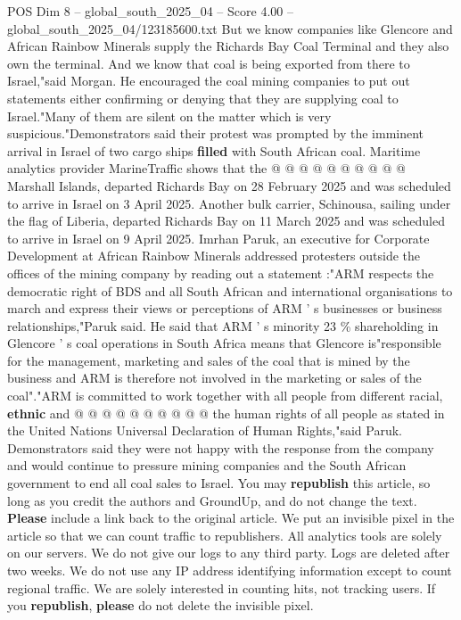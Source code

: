 \begin{textsample}{POS Dim 8 – global\_south\_2025\_04 – Score 4.00 – global\_south\_2025\_04/123185600.txt}
But we know companies like Glencore and African Rainbow Minerals supply the Richards Bay Coal Terminal and they also own the terminal.
And we know that coal is being exported from there to Israel,"said Morgan.
He encouraged the coal mining companies to put out statements either confirming or denying that they are supplying coal to Israel."Many of them are silent on the matter which is very suspicious."Demonstrators said their protest was prompted by the imminent arrival in Israel of two cargo ships \textbf{filled} with South African coal.
Maritime analytics provider MarineTraffic shows that the @ @ @ @ @ @ @ @ @ @ Marshall Islands, departed Richards Bay on 28 February 2025 and was scheduled to arrive in Israel on 3 April 2025.
Another bulk carrier, Schinousa, sailing under the flag of Liberia, departed Richards Bay on 11 March 2025 and was scheduled to arrive in Israel on 9 April 2025.
Imrhan Paruk, an executive for Corporate Development at African Rainbow Minerals addressed protesters outside the offices of the mining company by reading out a statement :"ARM respects the democratic right of BDS and all South African and international organisations to march and express their views or perceptions of ARM ' s businesses or business relationships,"Paruk said.
He said that ARM ' s minority 23 \% shareholding in Glencore ' s coal operations in South Africa means that Glencore is"responsible for the management, marketing and sales of the coal that is mined by the business and ARM is therefore not involved in the marketing or sales of the coal"."ARM is committed to work together with all people from different racial, \textbf{ethnic} and @ @ @ @ @ @ @ @ @ @ the human rights of all people as stated in the United Nations Universal Declaration of Human Rights,"said Paruk.
Demonstrators said they were not happy with the response from the company and would continue to pressure mining companies and the South African government to end all coal sales to Israel.
You may \textbf{republish} this article, so long as you credit the authors and GroundUp, and do not change the text. \textbf{Please} include a link back to the original article.
We put an invisible pixel in the article so that we can count traffic to republishers.
All analytics tools are solely on our servers.
We do not give our logs to any third party.
Logs are deleted after two weeks.
We do not use any IP address identifying information except to count regional traffic.
We are solely interested in counting hits, not tracking users.
If you \textbf{republish}, \textbf{please} do not delete the invisible pixel.

\end{textsample}
